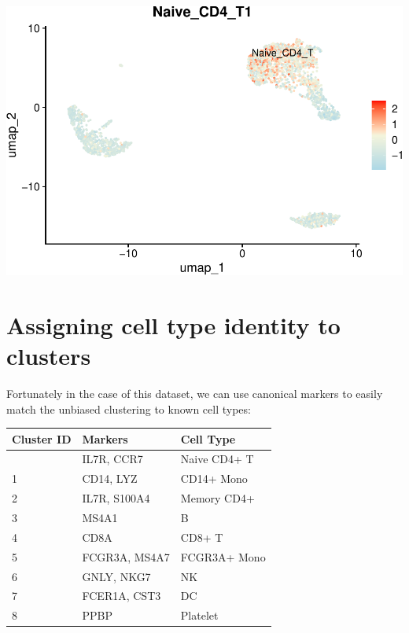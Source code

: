 \documentclass[
]{book}
\begin{document}
\includegraphics{scRNAseqInR_Doco_files/figure-latex/unnamed-chunk-32-1.pdf}

\hypertarget{assigning-cell-type-identity-to-clusters}{%
\section{Assigning cell type identity to clusters}\label{assigning-cell-type-identity-to-clusters}}

Fortunately in the case of this dataset, we can use canonical markers to easily match the unbiased clustering to known cell types:

\begin{longtable}[]{@{}lll@{}}
\toprule\noalign{}
Cluster ID & Markers & Cell Type \\
\midrule\noalign{}
\endhead
\bottomrule\noalign{}
\endlastfoot
0 & IL7R, CCR7 & Naive CD4+ T \\
1 & CD14, LYZ & CD14+ Mono \\
2 & IL7R, S100A4 & Memory CD4+ \\
3 & MS4A1 & B \\
4 & CD8A & CD8+ T \\
5 & FCGR3A, MS4A7 & FCGR3A+ Mono \\
6 & GNLY, NKG7 & NK \\
7 & FCER1A, CST3 & DC \\
8 & PPBP & Platelet \\
\end{longtable}
\end{document}
